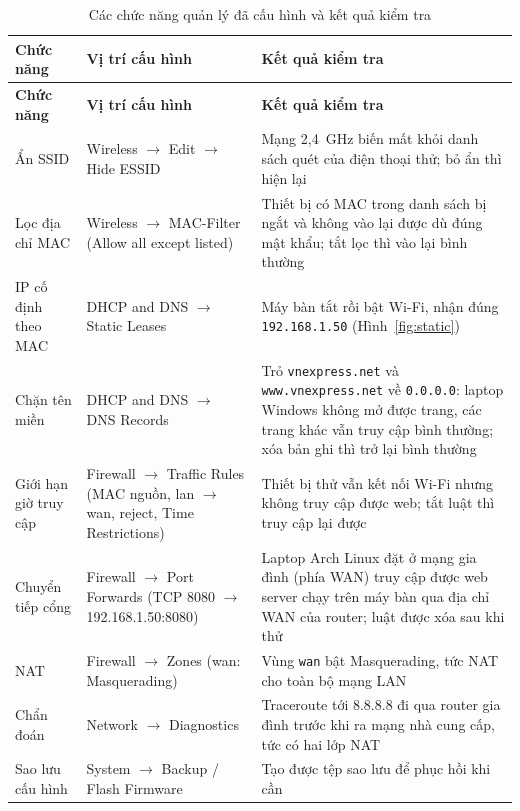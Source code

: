 \documentclass[12pt,a4paper]{article}
\numberwithin{figure}{section}
\numberwithin{table}{section}
\newcommand{\mono}[1]{\texttt{#1}}
\begin{document}
\begin{longtable}{@{}P{2.8cm} P{4.2cm} P{7.7cm}@{}}
  \caption{Các chức năng quản lý đã cấu hình và kết quả kiểm tra}\label{tab:nangcao}\\
  \toprule
  \textbf{Chức năng} & \textbf{Vị trí cấu hình} & \textbf{Kết quả kiểm tra}\\
  \midrule\endfirsthead
  \toprule
  \textbf{Chức năng} & \textbf{Vị trí cấu hình} & \textbf{Kết quả kiểm tra}\\
  \midrule\endhead
  \bottomrule\endfoot
  Ẩn SSID & Wireless $\rightarrow$ Edit $\rightarrow$ Hide ESSID & Mạng
  2,4~GHz biến mất khỏi danh sách quét của điện thoại thử; bỏ ẩn thì hiện
  lại\\
  Lọc địa chỉ MAC & Wireless $\rightarrow$ MAC-Filter (Allow all except listed)
  & Thiết bị có MAC trong danh sách bị ngắt và không vào lại được dù đúng mật
  khẩu; tắt lọc thì vào lại bình thường\\
  IP cố định theo MAC & DHCP and DNS $\rightarrow$ Static Leases & Máy bàn tắt
  rồi bật Wi-Fi, nhận đúng \mono{192.168.1.50} (Hình~\ref{fig:static})\\
  Chặn tên miền & DHCP and DNS $\rightarrow$ DNS Records & Trỏ
  \mono{vnexpress.net} và \mono{www.vnexpress.net} về \mono{0.0.0.0}:
  laptop Windows không mở được trang, các trang khác vẫn truy cập bình thường; xóa bản ghi thì trở lại bình thường\\
  Giới hạn giờ truy cập & Firewall $\rightarrow$ Traffic Rules (MAC nguồn,
  lan $\rightarrow$ wan, reject, Time Restrictions) & Thiết bị thử vẫn
  kết nối Wi-Fi nhưng không truy cập được web; tắt luật thì truy cập lại
  được\\
  Chuyển tiếp cổng & Firewall $\rightarrow$ Port Forwards (TCP 8080
  $\rightarrow$ 192.168.1.50:8080) & Laptop Arch Linux đặt ở mạng gia đình
  (phía WAN) truy cập được web server chạy trên máy bàn qua địa chỉ WAN của
  router; luật được xóa sau khi thử\\
  NAT & Firewall $\rightarrow$ Zones (wan: Masquerading) & Vùng \mono{wan} bật
  Masquerading, tức NAT cho toàn bộ mạng LAN\\
  Chẩn đoán & Network $\rightarrow$ Diagnostics & Traceroute tới 8.8.8.8
  đi qua router gia đình trước khi ra mạng nhà cung cấp, tức có hai lớp NAT\\
  Sao lưu cấu hình & System $\rightarrow$ Backup / Flash Firmware & Tạo được
  tệp sao lưu để phục hồi khi cần\\
\end{longtable}
\end{document}
